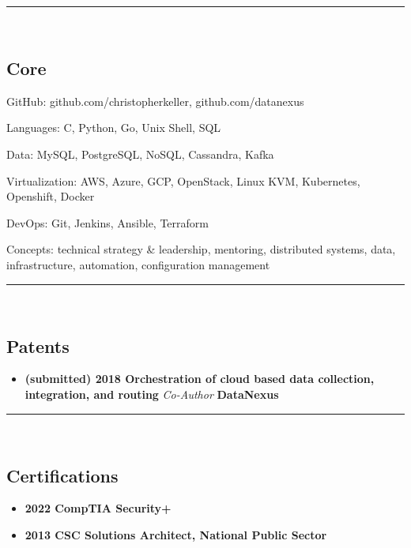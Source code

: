 

\hrule\
\vspace{-0.4em}
\subsection*{Core}
\begin{indentsection}{\parindent}
    \begin{description*}
        \item[GitHub:] github.com/christopherkeller, github.com/datanexus
        \item[Languages:] C, Python, Go, Unix Shell, \textsc{SQL}
        \item[Data:] My\textsc{SQL}, Postgre\textsc{SQL}, NoSQL, Cassandra, Kafka
        \item[Virtualization:] AWS, Azure, GCP, OpenStack, Linux KVM, Kubernetes, Openshift, Docker
        \item[DevOps:] Git, Jenkins, Ansible, Terraform
        \item[Concepts:] technical strategy \& leadership, mentoring, distributed systems, data, infrastructure, automation, configuration management
	\end{description*}
\end{indentsection}
\hrule\
\vspace{-0.4em}

\subsection*{Patents}

\begin{itemize}
    \parskip=0.1em
    \item
    \headerrow
        {\textbf{(submitted) 2018 Orchestration of cloud based data collection, integration, and routing} {\emph{Co-Author}}}
        {\textbf{DataNexus}}
\end{itemize}

\hrule\
\vspace{-0.4em}

\subsection*{Certifications}

\begin{itemize}
    \parskip=0.1em
    \item
        {\textbf{2022 CompTIA Security+}}
    \item
        {\textbf{2013 CSC Solutions Architect, National Public Sector}}
\end{itemize}


